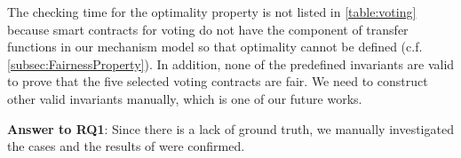 The checking time for the optimality property is not listed in \cref{table:voting} because
smart contracts for voting do not have the component of transfer functions in our mechanism model
so that optimality cannot be defined (c.f. \cref{subsec:FairnessProperty}). In addition, none of
the predefined invariants are valid to prove that the five selected voting contracts are fair. We
need to construct other valid invariants manually, which is one of our future works.




\begin{tcolorbox}[size=title, opacityfill=0.1]
	\textbf{Answer to RQ1}:
	Since there is a lack of ground truth, we manually investigated the cases and the results of \faircon
	were confirmed.
\end{tcolorbox}




